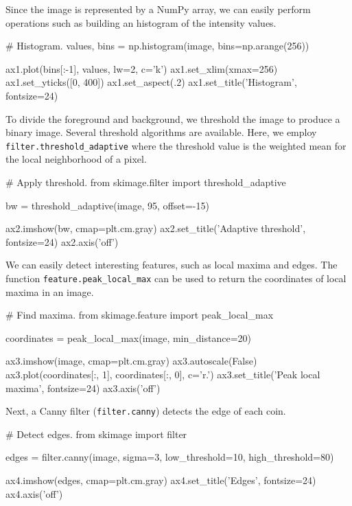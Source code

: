   Since the image is represented by a NumPy array, we can easily perform operations such as building an histogram of the intensity values.

  \begin{pyverbatim}
    # Histogram.
    values, bins = np.histogram(image,
                                bins=np.arange(256))

    ax1.plot(bins[:-1], values, lw=2, c='k')
    ax1.set_xlim(xmax=256)
    ax1.set_yticks([0, 400])
    ax1.set_aspect(.2)
    ax1.set_title('Histogram', fontsize=24)
  \end{pyverbatim}

  To divide the foreground and background, we threshold the image to produce a binary image.  Several threshold algorithms are available. Here, we employ \linebreak\texttt{filter.threshold\_adaptive} where the threshold value is the weighted mean for the local neighborhood of a pixel.

  \begin{pyverbatim}
    # Apply threshold.
    from skimage.filter import threshold_adaptive

    bw = threshold_adaptive(image, 95, offset=-15)

    ax2.imshow(bw, cmap=plt.cm.gray)
    ax2.set_title('Adaptive threshold', fontsize=24)
    ax2.axis('off')
  \end{pyverbatim}

  We can easily detect interesting features, such as local maxima and edges. The function \texttt{feature.peak\_local\_max} can be used to return the coordinates of local maxima in an image.

  \begin{pyverbatim}
    # Find maxima.
    from skimage.feature import peak_local_max

    coordinates = peak_local_max(image, min_distance=20)

    ax3.imshow(image, cmap=plt.cm.gray)
    ax3.autoscale(False)
    ax3.plot(coordinates[:, 1],
             coordinates[:, 0], c='r.')
    ax3.set_title('Peak local maxima', fontsize=24)
    ax3.axis('off')
  \end{pyverbatim}

  Next, a Canny filter (\texttt{filter.canny}) \citep{Canny} detects the edge of each coin.

  \begin{pyverbatim}
    # Detect edges.
    from skimage import filter

    edges = filter.canny(image, sigma=3,
                         low_threshold=10,
                         high_threshold=80)

    ax4.imshow(edges, cmap=plt.cm.gray)
    ax4.set_title('Edges', fontsize=24)
    ax4.axis('off')
  \end{pyverbatim}

